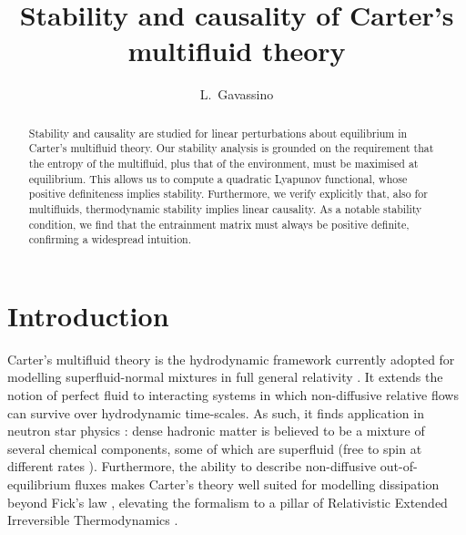 \documentclass[a4paper, amsfonts, amssymb, amsmath, reprint, showkeys, nofootinbib, twoside, onecolumn,notitlepage]{revtex4-1}
\theoremstyle{definition}
\theoremstyle{theorem}
\begin{document}
\title{Stability and causality of Carter's multifluid theory}
\author{L.~Gavassino}



\begin{abstract}
Stability and causality are studied for linear perturbations about equilibrium in Carter's multifluid theory. Our stability analysis is grounded on the requirement that the entropy of the multifluid, plus that of the environment, must be maximised at equilibrium. This allows us to compute a quadratic Lyapunov functional, whose positive definiteness implies stability. Furthermore, we verify explicitly that, also for multifluids, thermodynamic stability implies linear causality. As a notable stability condition, we find that the entrainment matrix must always be positive definite, confirming a widespread intuition.
\end{abstract} 



\maketitle



\section{Introduction}

Carter's multifluid theory \cite{carter1991,cool1995,Carter_starting_point} is the hydrodynamic framework currently adopted for modelling superfluid-normal mixtures in full general relativity \cite{Prix_single_vortex,andersson2007review,Termo}. It extends the notion of perfect fluid to interacting systems in which non-diffusive relative flows can survive over hydrodynamic time-scales. As such, it finds application in neutron star physics \cite{langlois98,andersson_comer2000,GavassinoIordanskii2021}: dense hadronic matter is believed to be a mixture of several chemical components, some of which are superfluid (free to spin at different rates \cite{sourie_glitch2017,antonelli+2018,Geo2020}). Furthermore, the ability to describe non-diffusive out-of-equilibrium fluxes makes Carter's theory well suited for modelling dissipation beyond Fick's law \cite{noto_rel,Lopez09,Lopez11}, elevating the formalism to a pillar of Relativistic Extended Irreversible Thermodynamics \cite{Jou_Extended,BulkGavassino,
GavassinoUEIT2021,CamelioGavassino2022}. 
\end{document}
